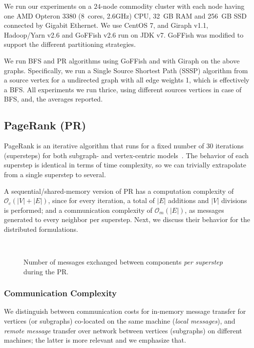 \documentclass[10pt,conference, compsocconf]{IEEEtran}
\begin{document}
 We run our experiments on a $24$-node commodity cluster with each node having one AMD Opteron 3380 (8~cores, 2.6GHz) CPU, 32~GB RAM and 256~GB SSD connected by Gigabit Ethernet. We use CentOS 7, and Giraph v1.1, Hadoop/Yarn v2.6 and GoFFish v2.6 run on JDK v7. GoFFish was modified to support the different partitioning strategies. 

We run BFS and PR algorithms using GoFFish and with Giraph on the above graphs. Specifically, we run a Single Source Shortest Path (SSSP) algorithm from a source vertex for a undirected graph with all edge weights 1, which is effectively a BFS. All experiments we run thrice, using different sources vertices in case of BFS, and, the averages reported.



\subsection{PageRank (PR)}
PageRank is an iterative algorithm that runs for a fixed number of $30$ iterations (supersteps) for both subgraph- and vertex-centric models~\cite{pregel, goffish}. The behavior of each superstep is identical in terms of time complexity, so we can trivially extrapolate from a single superstep to several. 

A sequential/shared-memory version of PR has a computation complexity of $\mathcal{O}_c(|V| + |E|)$, since for every iteration, a total of $|E|$ additions and $|V|$ divisions is performed; and a communication complexity of $\mathcal{O}_m(|E|)$, as messages generated to every neighbor per superstep. Next, we discuss their behavior for the distributed formulations.


\begin{figure*}[t!]
\centering {}~~~~
\caption{Number of messages exchanged between components \emph{per superstep} during the PR.}
\label{fig:Messages-PR}
\vspace{-0.1in}
\end{figure*}

\subsubsection{Communication Complexity}
We distinguish between communication costs for in-memory message transfer for vertices (or subgraphs) co-located on the same machine (\emph{local messages}), and \emph{remote message} transfer over network between vertices (subgraphs) on different machines; the latter is more relevant and we emphasize that. 
\end{document}
